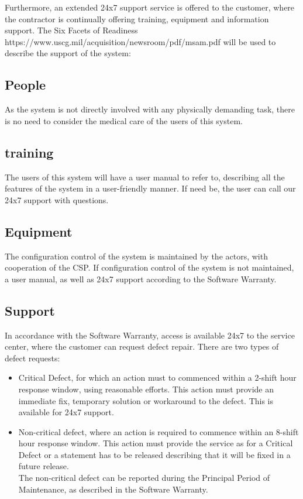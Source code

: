 \noindent Furthermore, an extended 24x7 support service is offered to the customer, where the contractor is continually offering training, equipment and information support.
The Six Facets of Readiness \cite{bibid} https://www.uscg.mil/acquisition/newsroom/pdf/msam.pdf will be used to describe the support of the system:

\subsection{People}
As the system is not directly involved with any physically demanding task, there is no need to consider the medical care of the users of this system.

\subsection{training}
The users of this system will have a user manual to refer to, describing all the features of the system in a user-friendly manner. If need be, the user can call our 24x7 support with questions.

\subsection{Equipment}
The configuration control of the system is maintained by the actors, with cooperation of the CSP. If configuration control of the system is not maintained, a user manual, as well as 24x7 support according to the Software Warranty. 

\subsection{Support}
In accordance with the Software Warranty, access is available 24x7 to the service center, where the customer can request defect repair. There are two types of defect requests:
\begin{itemize}
	\itemsep0em
	\item Critical Defect, for which an action must to commenced within a 2-shift hour response window, using reasonable efforts. This action must provide an immediate fix, temporary solution or workaround to the defect. This is available for 24x7 support.
	\item Non-critical defect, where an action is required to commence within an 8-shift hour response window. This action must provide the service as for a Critical Defect or a statement has to be released describing that it will be fixed in a future release. \\
	The non-critical defect can be reported during the Principal Period of Maintenance, as described in the Software Warranty.
\end{itemize}

